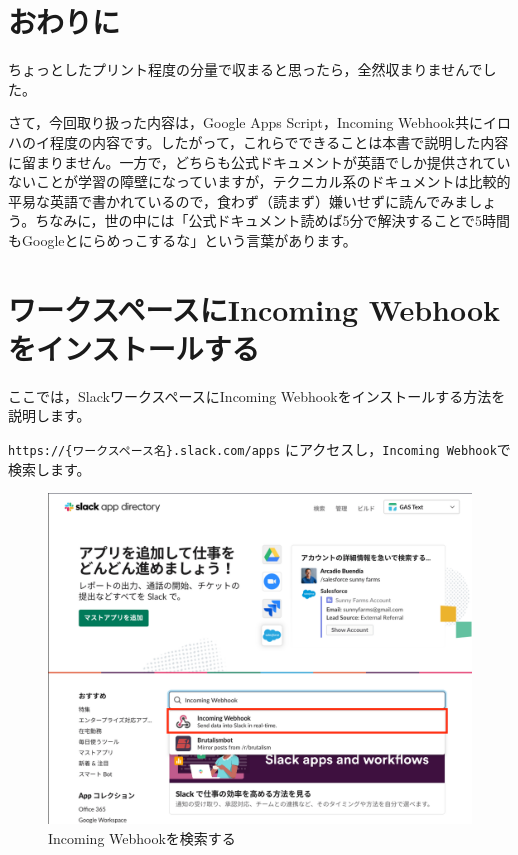 \documentclass[uplatex,a4j]{jsarticle}
\begin{document}
\section{おわりに}


ちょっとしたプリント程度の分量で収まると思ったら，全然収まりませんでした。

さて，今回取り扱った内容は，Google Apps Script，Incoming Webhook共にイロハのイ程度の内容です。したがって，これらでできることは本書で説明した内容に留まりません。一方で，どちらも公式ドキュメントが英語でしか提供されていないことが学習の障壁になっていますが，テクニカル系のドキュメントは比較的平易な英語で書かれているので，食わず（読まず）嫌いせずに読んでみましょう。ちなみに，世の中には「公式ドキュメント読めば5分で解決することで5時間もGoogleとにらめっこするな」という言葉があります\footnotemark。

\clearpage
\appendix

\section{ワークスペースにIncoming Webhookをインストールする}
\label{appendix:install_incoming_webhook}

ここでは，SlackワークスペースにIncoming Webhookをインストールする方法を説明します。

\verb|https://{ワークスペース名}.slack.com/apps| にアクセスし，\verb|Incoming Webhook|で検索します。

\begin{figure}[H]
 \centering
 \includegraphics[keepaspectratio, scale=0.4]{images/search_incoming_webhook.png}
 \caption{Incoming Webhookを検索する}
 \label{fig:search_incoming_webhook}
\end{figure}
\end{document}
